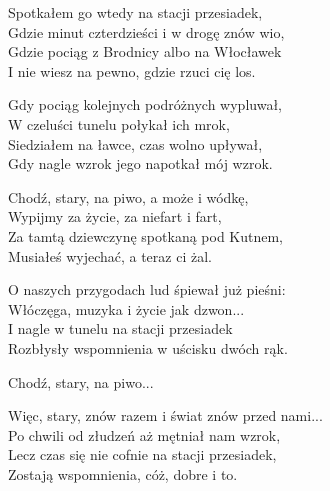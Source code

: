 \begin{text}
    Spotkałem go wtedy na stacji przesiadek,\\
    Gdzie minut czterdzieści i w drogę znów wio,\\
    Gdzie pociąg z Brodnicy albo na Włocławek\\
    I nie wiesz na pewno, gdzie rzuci cię los.

    Gdy pociąg kolejnych podróżnych wypluwał,\\
    W czeluści tunelu połykał ich mrok,\\
    Siedziałem na ławce, czas wolno upływał,\\
    Gdy nagle wzrok jego napotkał mój wzrok.

    \vin Chodź, stary, na piwo, a może i wódkę,\\
    \vin Wypijmy za życie, za niefart i fart,\\
    \vin Za tamtą dziewczynę spotkaną pod Kutnem,\\
    \vin Musiałeś wyjechać, a teraz ci żal.

    O naszych przygodach lud śpiewał już pieśni:\\
    Włóczęga, muzyka i życie jak dzwon...\\
    I nagle w tunelu na stacji przesiadek\\
    Rozbłysły wspomnienia w uścisku dwóch rąk.

    Chodź, stary, na piwo...

    Więc, stary, znów razem i świat znów przed nami...\\
    Po chwili od złudzeń aż mętniał nam wzrok,\\
    Lecz czas się nie cofnie na stacji przesiadek,\\
    Zostają wspomnienia, cóż, dobre i to.
\end{text}
\begin{chord}

\end{chord}